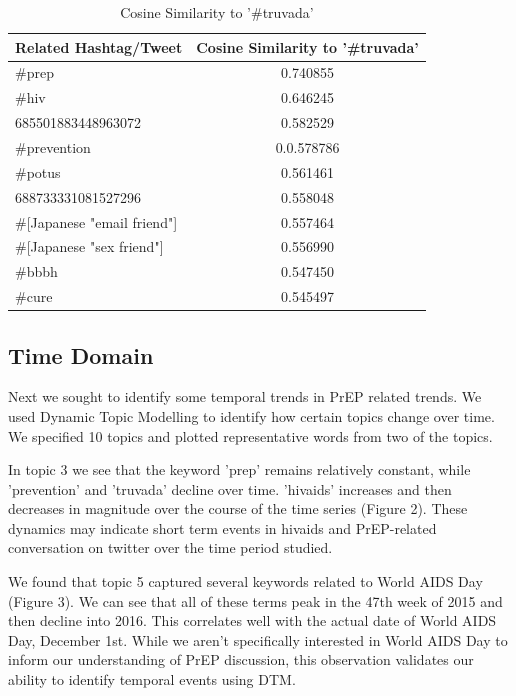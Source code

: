\documentclass{sig-alternate-05-2015}
\begin{document}
\begin{table}
\centering
\caption{Cosine Similarity to '\#truvada'}
\begin{tabular}{|l|c|} \hline
Related Hashtag/Tweet & Cosine Similarity to '\#truvada'\\ \hline
\#prep & 0.740855\\ \hline
\#hiv & 0.646245\\ \hline
685501883448963072 & 0.582529\\ \hline
\#prevention & 0.0.578786\\ \hline
\#potus & 0.561461\\ \hline
688733331081527296 & 0.558048\\ \hline
\#[Japanese "email friend"] & 0.557464\\ \hline
\#[Japanese "sex friend"] & 0.556990\\ \hline
\#bbbh & 0.547450\\ \hline
\#cure & 	0.545497\\ \hline
\hline\end{tabular}
\end{table}


\subsection{Time Domain}

Next we sought to identify some temporal trends in PrEP related trends. We used Dynamic Topic Modelling to identify how certain topics change over time. We specified 10 topics and plotted representative words from two of the topics.

In topic 3 we see that the keyword 'prep' remains relatively constant, while 'prevention' and 'truvada' decline over time. 'hivaids' increases and then decreases in magnitude over the course of the time series (Figure 2). These dynamics may indicate short term events in hivaids and PrEP-related conversation on twitter over the time period studied.

We found that topic 5 captured several keywords related to World AIDS Day (Figure 3). We can see that all of these terms peak in the 47th week of 2015 and then decline into 2016. This correlates well with the actual date of World AIDS Day, December 1st. While we aren't specifically interested in World AIDS Day to inform our understanding of PrEP discussion, this observation validates our ability to identify temporal events using DTM.
\end{document}
